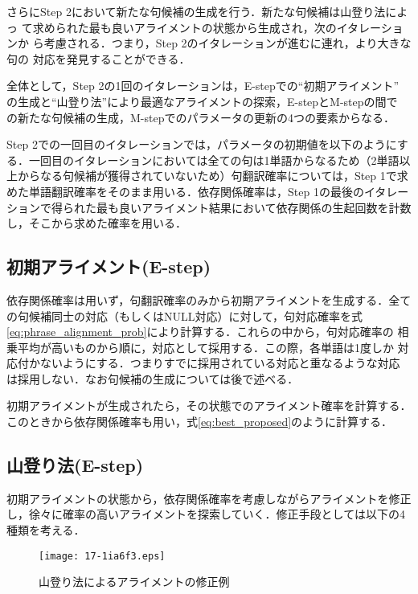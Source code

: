 \documentclass[japanese]{jnlp_1.4}
\begin{document}
さらにStep 2において新たな句候補の生成を行う．新たな句候補は山登り法によっ
て求められた最も良いアライメントの状態から生成され，次のイタレーションか
ら考慮される．つまり，Step 2のイタレーションが進むに連れ，より大きな句の
対応を発見することができる．

全体として，Step 2の1回のイタレーションは，E-stepでの“初期アライメント”
の生成と“山登り法”により最適なアライメントの探索，E-stepとM-stepの間で
の新たな句候補の生成，M-stepでのパラメータの更新の4つの要素からなる．

Step 2での一回目のイタレーションでは，パラメータの初期値を以下のようにす
る．一回目のイタレーションにおいては全ての句は1単語からなるため（2単語以
上からなる句候補が獲得されていないため）句翻訳確率については，Step 1で求
めた単語翻訳確率をそのまま用いる．依存関係確率は，Step 1の最後のイタレー
ションで得られた最も良いアライメント結果において依存関係の生起回数を計数
し，そこから求めた確率を用いる．


\subsection*{初期アライメント(E-step)}
\label{initial_align}

依存関係確率は用いず，句翻訳確率のみから初期アライメントを生成する．全て
の句候補同士の対応（もしくはNULL対応）に対して，句対応確率を式
\ref{eq:phrase_alignment_prob}により計算する．これらの中から，句対応確率の
相乗平均が高いものから順に，対応として採用する．この際，各単語は1度しか
対応付かないようにする．つまりすでに採用されている対応と重なるような対応
は採用しない．なお句候補の生成については後で述べる．

初期アライメントが生成されたら，その状態でのアライメント確率を計算する．
このときから依存関係確率も用い，式\ref{eq:best_proposed}のように計算する．



\subsection*{山登り法(E-step)}

初期アライメントの状態から，依存関係確率を考慮しながらアライメントを修正
し，徐々に確率の高いアライメントを探索していく．修正手段としては以下の4
種類を考える．

\begin{figure}[t]
 \begin{center}
  \texttt{[image: 17-1ia6f3.eps]}
 \end{center}
  \caption{山登り法によるアライメントの修正例}
  \label{fig:hillclimb}
\end{figure}
\end{document}
